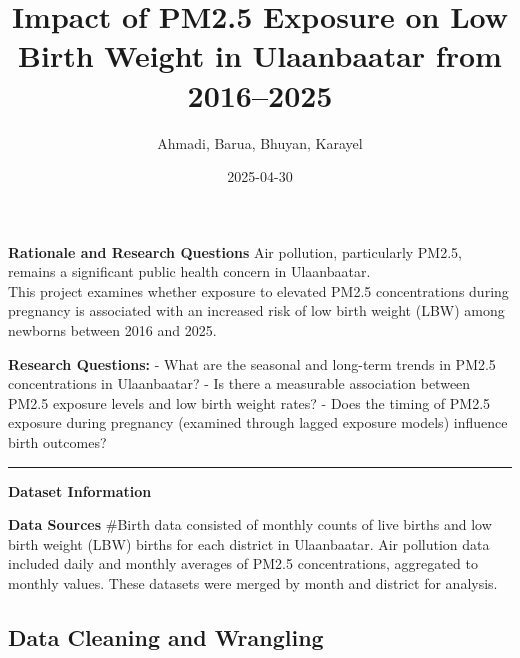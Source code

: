 \documentclass[
]{article}
\title{Impact of PM2.5 Exposure on Low Birth Weight in Ulaanbaatar from
2016--2025}
\author{Ahmadi, Barua, Bhuyan, Karayel}
\date{2025-04-30}
\begin{document}
\maketitle

{
\setcounter{tocdepth}{2}
\tableofcontents
}
\textbf{Rationale and Research Questions} Air pollution, particularly
PM2.5, remains a significant public health concern in Ulaanbaatar.\\
This project examines whether exposure to elevated PM2.5 concentrations
during pregnancy is associated with an increased risk of low birth
weight (LBW) among newborns between 2016 and 2025.

\textbf{Research Questions:} - What are the seasonal and long-term
trends in PM2.5 concentrations in Ulaanbaatar? - Is there a measurable
association between PM2.5 exposure levels and low birth weight rates? -
Does the timing of PM2.5 exposure during pregnancy (examined through
lagged exposure models) influence birth outcomes?

\begin{center}\rule{0.5\linewidth}{0.5pt}\end{center}

\textbf{Dataset Information}

\textbf{Data Sources} \#Birth data consisted of monthly counts of live
births and low birth weight (LBW) births for each district in
Ulaanbaatar. Air pollution data included daily and monthly averages of
PM2.5 concentrations, aggregated to monthly values. These datasets were
merged by month and district for analysis.

\subsection{Data Cleaning and
Wrangling}\label{data-cleaning-and-wrangling}
\end{document}
